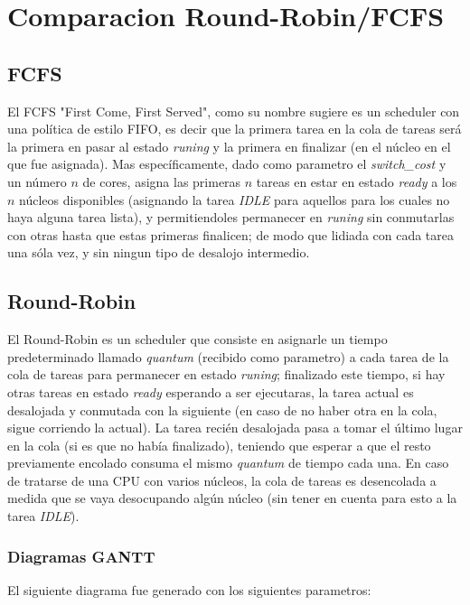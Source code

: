 \section{Comparacion Round-Robin/FCFS}

\subsection{FCFS}

El FCFS "First Come, First Served", como su nombre sugiere es un scheduler con una política de estilo FIFO, es decir que la primera tarea en la cola de tareas será la primera en pasar al estado \textit{runing} y la primera en finalizar (en el núcleo en el que fue asignada). Mas específicamente, dado como parametro el \textit{switch\_cost} y un número $n$ de cores, asigna las primeras $n$ tareas en estar en estado \textit{ready} a los $n$ núcleos disponibles (asignando la tarea \textit{IDLE} para aquellos para los cuales no haya alguna tarea lista), y permitiendoles permanecer en \textit{runing} sin conmutarlas con otras hasta que estas primeras finalicen; de modo que lidiada con cada tarea una sóla vez, y sin ningun tipo de desalojo intermedio. 

\subsection{Round-Robin}

El Round-Robin es un scheduler que consiste en asignarle un tiempo predeterminado llamado \textit{quantum} (recibido como parametro) a cada tarea de la cola de tareas para permanecer en estado \textit{runing}; finalizado este tiempo, si hay otras tareas en estado \textit{ready} esperando a ser ejecutaras, la tarea actual es desalojada y conmutada con la siguiente (en caso de no haber otra en la cola, sigue corriendo la actual). La tarea recién desalojada pasa a tomar el último lugar en la cola (si es que no había finalizado), teniendo que esperar a que el resto previamente encolado consuma el mismo \textit{quantum} de tiempo cada una. En caso de tratarse de una CPU con varios núcleos, la cola de tareas es desencolada a medida que se vaya desocupando algún núcleo (sin tener en cuenta para esto a la tarea \textit{IDLE}).

\subsubsection{Diagramas GANTT}

El siguiente diagrama fue generado con los siguientes parametros:

